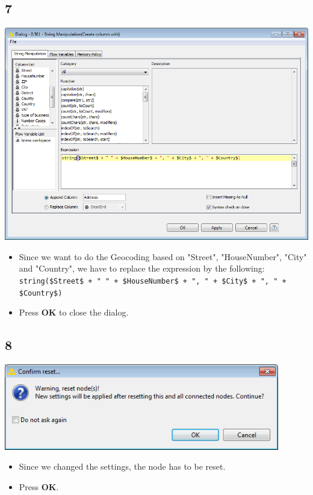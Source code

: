 \documentclass{beamer}
\begin{document}
\subsection{7}
\begin{frame}
	\begin{center}
  		\includegraphics[height=0.6\textheight]{7.png}
	\end{center}
	\begin{itemize}
		\item Since we want to do the Geocoding based on "Street", "HouseNumber", "City" and "Country", we have to replace the expression by the following: \texttt{string(\$Street\$ + " " + \$HouseNumber\$ + ", " + \$City\$ + ", " + \$Country\$)}
		\item Press \textbf{OK} to close the dialog.
	\end{itemize}
\end{frame}

\subsection{8}
\begin{frame}
	\begin{center}
  		\includegraphics[width=0.9\textwidth]{8.png}
	\end{center}
	\begin{itemize}
		\item Since we changed the settings, the node has to be reset.
		\item Press \textbf{OK}.
	\end{itemize}
\end{frame}
\end{document}
